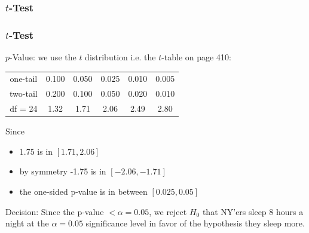 \documentclass[handout]{beamer}
\newcommand{\blue}[1]{\textcolor{blue2}{#1}}
\newcommand{\xbar}{\overline{x}}
\begin{document}
\begin{frame}
\frametitle{$t$-Test}
%
%
\end{frame}


\begin{frame}
\frametitle{$t$-Test}

$p$-Value: we use the $t$ distribution i.e. the $t$-table on page 410:
\begin{center}
\begin{tabular}{c|ccccc}
\hline
one-tail & 0.100 & 0.050 & 0.025 & 0.010 & 0.005\\
two-tail & 0.200 & 0.100 & 0.050 & 0.020 & 0.010\\
\hline
df = 24 & 1.32 & 1.71 & 2.06 & 2.49 & 2.80\\
\hline
\end{tabular}
\end{center}

\pause Since 
\begin{itemize}
\pause \item 1.75 is in $[1.71, 2.06]$
\pause \item by symmetry -1.75 is in $[-2.06, -1.71]$
\pause \item the one-sided p-value is in between $[0.025, 0.05]$
\end{itemize}
\vspace{0.5cm}

\pause Decision: Since the p-value $< \alpha=0.05$, we reject $H_0$ that NY'ers sleep 8 hours a night at the $\alpha=0.05$ significance level in favor of the hypothesis they sleep more.
\end{frame}
\end{document}
